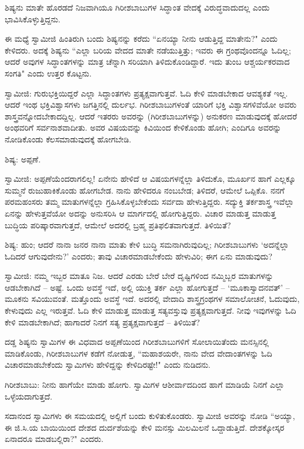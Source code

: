 ಶಿಷ್ಯನು ಮಾತೇ ಹೊರಡದೆ ನಿಜವಾಗಿಯೂ ಗಿರೀಶಬಾಬುಗಳ ಸಿದ್ಧಾಂತ ವೇದಕ್ಕೆ ವಿರುದ್ಧವಾದುದಲ್ಲ ಎಂದು ಭಾವಿಸಿಕೊಳ್ಳುತ್ತಿದ್ದನು.

ಈ ಮಧ್ಯೆ ಸ್ವಾಮೀಜಿ ಹಿಂತಿರುಗಿ ಬಂದು ಶಿಷ್ಯನನ್ನು ಕರೆದು “ಏನಯ್ಯಾ ನೀನು ಆಡುತ್ತಿದ್ದ ಮಾತೇನು?" ಎಂದು ಕೇಳಿದರು. ಅದಕ್ಕೆ ಶಿಷ್ಯನು “ಎಲ್ಲಾ ಬರಿಯ ವೇದದ ಮಾತೇ ನಡೆಯುತ್ತಿತ್ತು; ಇವರು ಈ ಗ್ರಂಥವೊಂದನ್ನೂ ಓದಿಲ್ಲ; ಆದರೆ ಅವುಗಳ ಸಿದ್ಧಾಂತಗಳನ್ನು ಮಾತ್ರ ಚೆನ್ನಾಗಿ ಸರಿಯಾಗಿ ತಿಳಿದುಕೊಂಡಿದ್ದಾರೆ. ಇದು ತುಂಬ ಆಶ್ಚರ್ಯಕರವಾದ ಸಂಗತಿ" ಎಂದು ಉತ್ತರ ಕೊಟ್ಟನು.

ಸ್ವಾಮೀಜಿ: ಗುರುಭಕ್ತಿಯಿದ್ದರೆ ಎಲ್ಲಾ ಸಿದ್ಧಾಂತಗಳು ಪ್ರತ್ಯಕ್ಷವಾಗುತ್ತವೆ. ಓದಿ ಕೇಳಿ ಮಾಡಬೇಕಾದ ಆವಶ್ಯಕತೆ ಇಲ್ಲ. ಆದರೆ ಇಂಥ ಭಕ್ತಿವಿಶ್ವಾಸಗಳು ಜಗತ್ತಿನಲ್ಲಿ ದುರ್ಲಭ. ಗಿರೀಶಬಾಬುಗಳಂತೆ ಯಾರಿಗೆ ಭಕ್ತಿ ವಿಶ್ವಾಸಗಳಿವೆಯೋ ಅವರು ಶಾಸ್ತ್ರವನ್ನೋದಬೇಕಾದದ್ದಿಲ್ಲ. ಆದರೆ ಇತರರು ಅವರನ್ನು (ಗಿರೀಶಬಾಬುಗಳನ್ನು) ಅನುಕರಣ ಮಾಡುವುದಕ್ಕೆ ಹೋದರೆ ಅಂಥವರಿಗೆ ಸರ್ವನಾಶವಾದೀತು. ಅವರ ವಿಷಯವನ್ನು ಕಿವಿಯಿಂದ ಕೇಳಿಕೊಂಡು ಹೋಗಿ; ಎಂದಿಗೂ ಅವರನ್ನು ನೋಡಿಕೊಂಡು ಕೆಲಸಮಾಡುವುದಕ್ಕೆ ಹೋಗಬೇಡಿ.

ಶಿಷ್ಯ: ಅಪ್ಪಣೆ.

ಸ್ವಾಮೀಜಿ: ಅಪ್ಪಣೆಯೆಂದರಾಗಲಿಲ್ಲ! ಏನೇನು ಹೇಳಿದೆ ಆ ವಿಷಯಗಳನ್ನೆಲ್ಲಾ ತಿಳಿದುಕೊ, ಮೂರ್ಖನ ಹಾಗೆ ಎಲ್ಲಕ್ಕೂ ಸುಮ್ಮನೆ ರುಜುಹಾಕಿಕೊಂಡು ಹೋಗಬೇಡ. ನಾನು ಹೇಳಿದರೂ ನಂಬಬೇಡ; ತಿಳಿದರೆ, ಆಮೇಲೆ ಒಪ್ಪಿಕೊ. ನನಗೆ ಪರಮಹಂಸರು ತಮ್ಮ ಮಾತುಗಳನ್ನೆಲ್ಲಾ ಗ್ರಹಿಸಿಕೊಳ್ಳಬೇಕೆಂದು ಸರ್ವದಾ ಹೇಳುತ್ತಿದ್ದರು. ಸದ್ಯುಕ್ತಿ ತರ್ಕಶಾಸ್ತ್ರ ಇವೆಲ್ಲಾ ಏನನ್ನು ಹೇಳುತ್ತವೆಯೋ ಅದನ್ನು ಅನುಸರಿಸಿ ಆ ಮಾರ್ಗದಲ್ಲಿ ಹೋಗುತ್ತಿದ್ದರು. ವಿಚಾರ ಮಾಡುತ್ತ ಮಾಡುತ್ತ ಬುದ್ಧಿಯ ಪರಿಷ್ಕಾರವಾಗುತ್ತದೆ, ಆಮೇಲೆ ಅದರಲ್ಲಿ ಬ್ರಹ್ಮ ಪ್ರತಿಫಲಿತವಾಗುತ್ತದೆ. ತಿಳಿಯಿತೆ?

ಶಿಷ್ಯ: ಹುಂ; ಆದರೆ ನಾನಾ ಜನರ ನಾನಾ ಮಾತು ಕೇಳಿ ಬುದ್ಧಿ ಸಮನಾಗಿರುವುದಿಲ್ಲ; ಗಿರೀಶಬಾಬುಗಳು ‘ಅದನ್ನೆಲ್ಲಾ ಓದಿದರೆ ಆಗುವುದೇನು?’ ಎಂದರು; ತಾವು ವಿಚಾರಮಾಡಬೇಕೆಂದು ಹೇಳುವಿರಿ; ಈಗ ಏನು ಮಾಡುವುದು?

ಸ್ವಾಮೀಜಿ: ನಮ್ಮ ಇಬ್ಬರ ಮಾತೂ ನಿಜ. ಆದರೆ ಎರಡು ಬೇರೆ ಬೇರೆ ದೃಷ್ಟಿಗಳಿಂದ ನಮ್ಮಿಬ್ಬರ ಮಾತುಗಳನ್ನು ಆಡಬೇಕಾಗಿದೆ – ಅಷ್ಟೆ. ಒಂದು ಅವಸ್ಥೆ ಇದೆ, ಅಲ್ಲಿ ಯುಕ್ತಿ ತರ್ಕ ಎಲ್ಲಾ ಹೋಗುತ್ತದೆ – ‘ಮೂಕಾಸ್ವಾದನವತ್’ – ಮೂಕನು ಸವಿಯುವಂತೆ. ಮತ್ತೊಂದು ಅವಸ್ಥೆ ಇದೆ. ಅದರಲ್ಲಿ ವೇದಾದಿ ಶಾಸ್ತ್ರಗ್ರಂಥಗಳ ಸಮಾಲೋಚನೆ, ಓದುವುದು, ಕೇಳುವುದು ಎಲ್ಲ ಇರುತ್ತವೆ. ಓದಿ ಕೇಳಿ ಮಾಡುತ್ತ ಮಾಡುತ್ತ ಸತ್ಯವಸ್ತುವು ಪ್ರತ್ಯಕ್ಷವಾಗುತ್ತದೆ. ನೀವು ಇವುಗಳನ್ನು ಓದಿ ಕೇಳಿ ಮಾಡಬೇಕಾಗಿದೆ; ಹಾಗಾದರೆ ನಿನಗೆ ಸತ್ಯ ಪ್ರತ್ಯಕ್ಷವಾಗುತ್ತದೆ – ತಿಳಿಯಿತೆ?

ದಡ್ಡ ಶಿಷ್ಯನು ಸ್ವಾಮಿಗಳ ಈ ವಿಧವಾದ ಅಪ್ಪಣೆಯಿಂದ ಗಿರೀಶಬಾಬುಗಳಿಗೆ ಸೋಲಾಯಿತೆಂದು ಮನಸ್ಸಿನಲ್ಲಿ ಮಾಡಿಕೊಂಡು, ಗಿರೀಶಬಾಬುಗಳ ಕಡೆಗೆ ನೋಡುತ್ತ, “ಮಹಾಶಯರೇ, ನಾನು ವೇದ ವೇದಾಂತಗಳನ್ನು ಓದಿ ವಿಚಾರಮಾಡಬೇಕೆಂದು ಸ್ವಾಮಿಗಳು ಹೇಳಿದ್ದನ್ನು ಕೇಳಿದಿರಷ್ಟೇ!" ಎಂದು ನುಡಿದನು.

ಗಿರೀಶಬಾಬು: ನೀನು ಹಾಗೆಯೇ ಮಾಡು ಹೋಗು. ಸ್ವಾಮಿಗಳ ಆಶೀರ್ವಾದದಿಂದ ಹಾಗೆ ಮಾಡಿಯೆ ನಿನಗೆ ಎಲ್ಲಾ ಒಳ್ಳೆಯದಾಗುತ್ತದೆ.

ಸದಾನಂದ ಸ್ವಾಮಿಗಳು ಈ ಸಮಯದಲ್ಲಿ ಅಲ್ಲಿಗೆ ಬಂದು ಕುಳಿತುಕೊಂಡರು. ಸ್ವಾಮೀಜಿ ಅವರನ್ನು ನೋಡಿ “ಅಯ್ಯಾ, ಈ ಜಿ.ಸಿ.ಯ ಬಾಯಿಯಿಂದ ದೇಶದ ದುರ್ದಶೆಯನ್ನು ಕೇಳಿ ಮನಸ್ಸು ಮಿಲಮಿಲನೆ ಒದ್ದಾಡುತ್ತಿದೆ. ದೇಶಕ್ಕೋಸ್ಕರ ಏನಾದರೂ ಮಾಡಬಲ್ಲಿರಾ?" ಎಂದರು.

